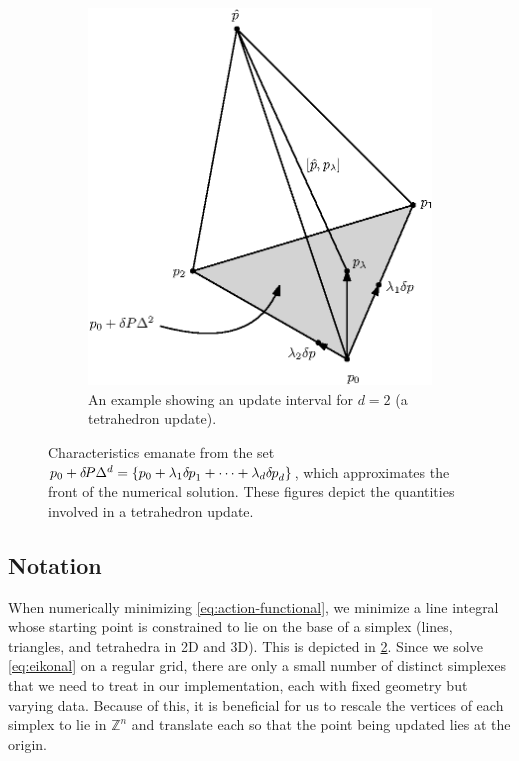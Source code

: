 \documentclass[sisc-eikonal.tex]{subfiles}
\begin{document}
\begin{figure}
\begin{subfigure}{.44\textwidth}
    \includegraphics[width=\linewidth]{simplex-diagram.eps}
    \caption{An example showing an update interval for $d = 2$ (a
      tetrahedron update).}\label{fig:tetra-diagram}
  \end{subfigure}
  \caption{Characteristics emanate from the set
    $p_0 + {\delta \hspace{-0.14em} P} \Delta^d = \left\{p_0 + \lambda_1 {\delta \hspace{-0.08em} p}_1 + \cdots +
      \lambda_d {\delta \hspace{-0.08em} p}_d\right\}$, which approximates the front of the
    numerical solution. These figures depict the quantities involved
    in a tetrahedron update.}\label{fig:simplex-diagrams}
\end{figure}

\subsection{Notation}

When numerically minimizing \cref{eq:action-functional}, we minimize a
line integral whose starting point is constrained to lie on the base
of a simplex (lines, triangles, and tetrahedra in 2D and 3D). This is
depicted in \cref{fig:simplex-diagrams}. Since we solve
\cref{eq:eikonal} on a regular grid, there are only a small number of
distinct simplexes that we need to treat in our implementation, each
with fixed geometry but varying data. Because of this, it is
beneficial for us to rescale the vertices of each simplex to lie in
$\mathbb{Z}^n$ and translate each so that the point being updated lies
at the origin.
\end{document}
